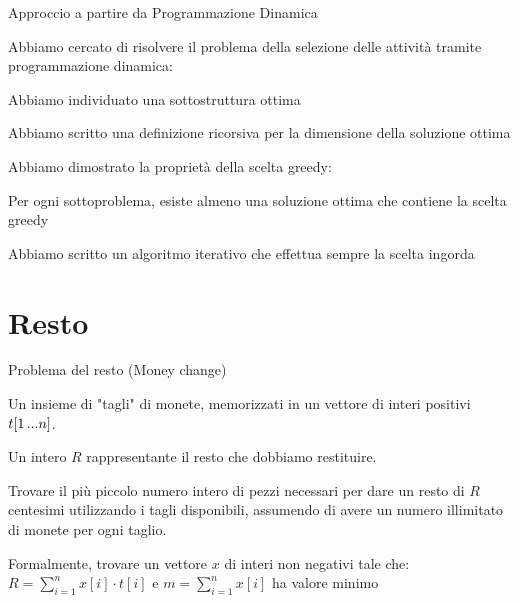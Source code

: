 \begin{frame}{Approccio a partire da Programmazione Dinamica}

\BIL
\item Abbiamo cercato di risolvere il problema della selezione delle attività tramite programmazione dinamica:
\BI
\item Abbiamo individuato una sottostruttura ottima
\item Abbiamo scritto una definizione ricorsiva per la dimensione della soluzione ottima
\EI
\item Abbiamo dimostrato la proprietà della scelta greedy:
\BI
\item Per ogni sottoproblema, esiste almeno una soluzione ottima che contiene la scelta greedy
\item Abbiamo scritto un algoritmo iterativo che effettua sempre la scelta ingorda
\EI
\EIL
\end{frame}

\section{Resto}

\begin{frame}{Problema del resto (Money change)}

\vspace{-9pt}
\begin{myboxtitle}[Input]
\BI
\item Un insieme di "tagli" di monete, memorizzati in un vettore di interi positivi $t[1 \mydots n]$.
\item Un intero $R$ rappresentante il resto che dobbiamo restituire.
\EI
\end{myboxtitle}

\smallskip
\begin{myboxtitle}
Trovare il più piccolo numero intero di pezzi necessari per dare un resto di $R$ 
centesimi utilizzando i tagli disponibili, assumendo di avere un numero illimitato di
monete per ogni taglio.

Formalmente, trovare un vettore $x$ di interi non negativi tale che:\\
$\displaystyle
	R = \sum_{i=1}^n x[i] \cdot t[i]
$ \qquad
e \qquad $m = \sum_{i=1}^n x[i]$ ha valore minimo


\end{myboxtitle}

\end{frame}

